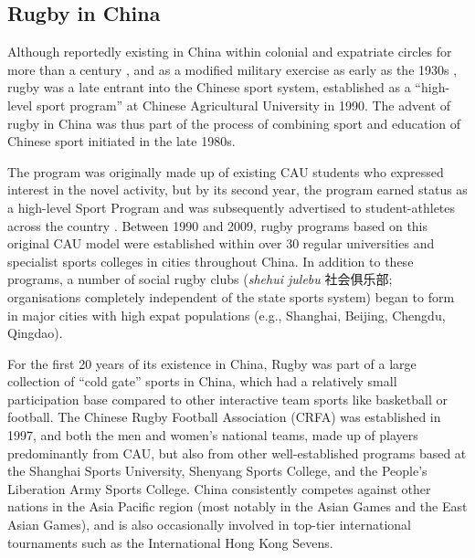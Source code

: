 \begin{CJK}{UTF8}{gbsn}
 \subsection{Rugby in China\label{sect:rugbyInChina}}
 Although reportedly existing in China within colonial and expatriate circles for more than a century \citep[210]{Reason1979}, and as a modified military exercise as early as the 1930s \citep[135]{Morris2004}, rugby was a late entrant into the Chinese sport system, established as a ``high-level sport program'' at  Chinese Agricultural University in 1990.  The advent of rugby in China was thus part of the process of combining sport and education of Chinese sport initiated in the late 1980s.

 The program was originally made up of existing CAU students who expressed interest in the novel activity, but by its second year, the program earned status as a high-level Sport Program and was subsequently advertised to student-athletes across the country \citep[2]{Xu2010}.  Between 1990 and 2009, rugby programs based on this original CAU model were established within over 30 regular universities and specialist sports colleges in cities throughout China.  In addition to these programs, a number of social rugby clubs (\textit{shehui julebu} 社会俱乐部; organisations completely independent of the state sports system) began to form in major cities with high expat populations (e.g., Shanghai, Beijing, Chengdu, Qingdao).

 For the first 20 years of its existence in China, Rugby was part of a large collection of ``cold gate'' sports in China, which had a relatively small participation base compared to other interactive team sports like basketball or football.  The Chinese Rugby Football Association (CRFA) was established in 1997, and both the men and women's national teams, made up of players predominantly from CAU, but also from other well-established programs based at the Shanghai Sports University, Shenyang Sports College, and the People's Liberation Army Sports College. China consistently competes against other nations in the Asia Pacific region (most notably in the Asian Games and the East Asian Games), and is also occasionally involved in top-tier international tournaments such as the International Hong Kong Sevens.


\end{CJK}
